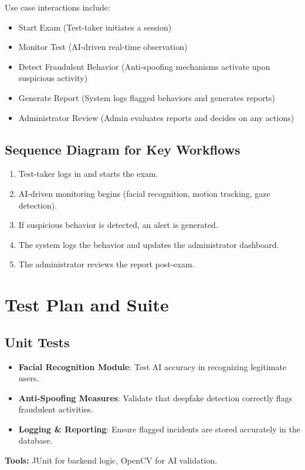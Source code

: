 \documentclass[12pt,a4paper]{article}
\begin{document}
Use case interactions include:
\begin{itemize}
\item Start Exam (Test-taker initiates a session)
\item Monitor Test (AI-driven real-time observation)
\item Detect Fraudulent Behavior (Anti-spoofing mechanisms activate upon suspicious activity)
\item Generate Report (System logs flagged behaviors and generates reports)
\item Administrator Review (Admin evaluates reports and decides on any actions)
\end{itemize}

\subsection{Sequence Diagram for Key Workflows}
\begin{enumerate}
\item Test-taker logs in and starts the exam.
\item AI-driven monitoring begins (facial recognition, motion tracking, gaze detection).
\item If suspicious behavior is detected, an alert is generated.
\item The system logs the behavior and updates the administrator dashboard.
\item The administrator reviews the report post-exam.
\end{enumerate}

\section{Test Plan and Suite}

\subsection{Unit Tests}
\begin{itemize}
\item \textbf{Facial Recognition Module}: Test AI accuracy in recognizing legitimate users.
\item \textbf{Anti-Spoofing Measures}: Validate that deepfake detection correctly flags fraudulent activities.
\item \textbf{Logging \& Reporting}: Ensure flagged incidents are stored accurately in the database.
\end{itemize}
\textbf{Tools:} JUnit for backend logic, OpenCV for AI validation.
\end{document}
